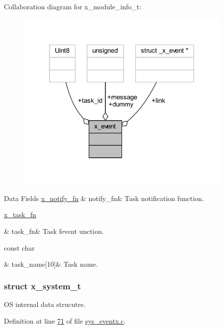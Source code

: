 Collaboration diagram for x\+\_\+module\+\_\+info\+\_\+t\+:\nopagebreak
\begin{figure}[H]
\begin{center}
\leavevmode
\includegraphics[width=301pt]{de/d05/a01702}
\end{center}
\end{figure}
\begin{DoxyFields}{Data Fields}
\hypertarget{a00037_af6e2104c75f84286ef0f813c7707ff11}{\hyperlink{a00036_a29c1adcba84e0c3e83657c91e9b2b764}{x\+\_\+notify\+\_\+fn}}\label{a00037_af6e2104c75f84286ef0f813c7707ff11}
&
notify\+\_\+fn&
Task notification function. \\
\hline

\hypertarget{a00037_ab14ce9c8fe0edb516f7f3d4e1e3a8854}{\hyperlink{a00036_ace830f248538d21bb16ea9c00997fcd7}{x\+\_\+task\+\_\+fn}}\label{a00037_ab14ce9c8fe0edb516f7f3d4e1e3a8854}
&
task\+\_\+fn&
Task fevent unction. \\
\hline

\hypertarget{a00037_a530a0539bc1522a85f661b6e1c9ebebd}{const char}\label{a00037_a530a0539bc1522a85f661b6e1c9ebebd}
&
task\+\_\+name\mbox{[}10\mbox{]}&
Task name. \\
\hline

\end{DoxyFields}
\label{da/d98/a00870}
\hypertarget{a00037_da/d98/a00870}{}
\subsubsection{struct x\+\_\+system\+\_\+t}
O\+S internal data strucutre. 

Definition at line \hyperlink{a00037_source_l00071}{71} of file \hyperlink{a00037_source}{sys\+\_\+eventx.\+c}.



